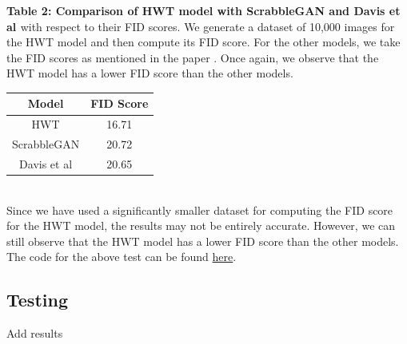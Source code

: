 \documentclass[10pt,twocolumn,letterpaper]{article}
\begin{document}
\textbf{Table 2: Comparison of HWT \cite{HWT} model with ScrabbleGAN \cite{fogel2020scrabblegan} and Davis et al \cite{davis2020text}} with respect to their FID scores. We generate a dataset of 10,000 images for the HWT model and then compute its FID score. For the other models, we take the FID scores as mentioned in the paper \cite{HWT}. Once again, we observe that the HWT model has a lower FID score than the other models. 
\begin{table}[h]
  \begin{center}
    \begin{tabular}{|c|c|}
      \hline
      \textbf{Model} & \textbf{FID Score} \\
      \hline
      HWT & 16.71 \\
      \hline
      ScrabbleGAN & 20.72 \\
      \hline
      Davis et al & 20.65 \\
      \hline
    \end{tabular}
  \end{center}
\end{table} \\
Since we have used a significantly smaller dataset for computing the FID score for the HWT model, the results may not be entirely accurate. However, we can still observe that the HWT model has a lower FID score than the other models.
The code for the above test can be found \href{https://github.com/Shambu-K/handwriting-generator-model/blob/main/compute-fid-hwt.ipynb}{here}.
\subsection{Testing}
Add results
\end{document}
